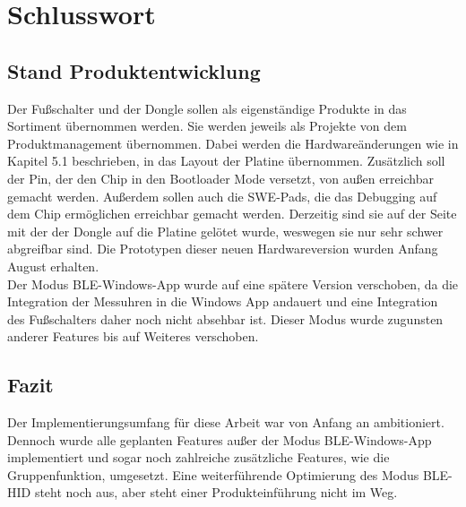 \section{Schlusswort}

\subsection{Stand Produktentwicklung}
Der Fußschalter und der Dongle sollen als eigenständige Produkte in das Sortiment übernommen werden. Sie werden jeweils als Projekte von dem Produktmanagement übernommen. Dabei werden die Hardwareänderungen wie in Kapitel 5.1 beschrieben, in das Layout der Platine übernommen. Zusätzlich soll der Pin, der den Chip in den Bootloader Mode versetzt, von außen erreichbar gemacht werden. Außerdem sollen auch die SWE-Pads, die das Debugging auf dem Chip ermöglichen erreichbar gemacht werden. Derzeitig sind sie auf der Seite mit der der Dongle auf die Platine gelötet wurde, weswegen sie nur sehr schwer abgreifbar sind. Die Prototypen dieser neuen Hardwareversion wurden Anfang August erhalten.\\
Der Modus BLE-Windows-App wurde auf eine spätere Version verschoben, da die Integration der Messuhren in die Windows App andauert und eine Integration des Fußschalters daher noch nicht absehbar ist. Dieser Modus wurde zugunsten anderer Features bis auf Weiteres verschoben. 

\subsection{Fazit}
Der Implementierungsumfang für diese Arbeit war von Anfang an ambitioniert. Dennoch wurde alle geplanten Features außer der Modus BLE-Windows-App implementiert und sogar noch zahlreiche zusätzliche Features, wie die Gruppenfunktion, umgesetzt. Eine weiterführende Optimierung des Modus BLE-HID steht noch aus, aber steht einer Produkteinführung nicht im Weg.